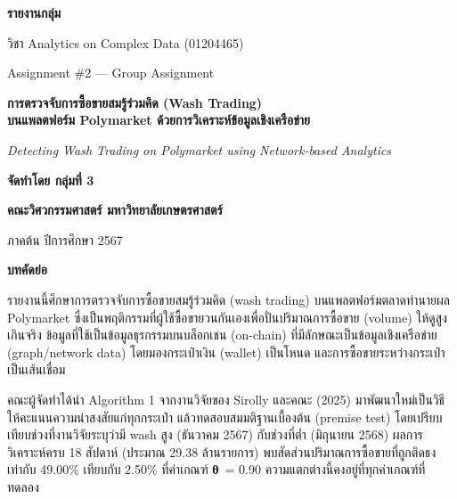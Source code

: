 \documentclass[12pt]{article}
\newcommand{\gtheta}{{\symfont\bfseries θ}}
\newcommand{\plainchap}[2]{%
  \clearpage\label{#2}%
  \begin{center}{\fontsize{20}{28}\selectfont\bfseries #1\par}\end{center}%
  \vspace{0.8em}\par}
\begin{document}
\thispagestyle{empty}
\begin{center}
  \vspace*{1.2cm}
  {\fontsize{26}{32}\selectfont\bfseries รายงานกลุ่ม}\par\vspace{0.6cm}
  {\fontsize{16}{22}\selectfont วิชา Analytics on Complex Data (01204465)}\par\vspace{0.2cm}
  {\fontsize{16}{22}\selectfont Assignment \#2 — Group Assignment}\par\vspace{1.4cm}

  {\fontsize{20}{28}\selectfont\bfseries การตรวจจับการซื้อขายสมรู้ร่วมคิด (Wash Trading)\\
   บนแพลตฟอร์ม Poly\-market ด้วยการวิเคราะห์ข้อมูลเชิงเครือข่าย}\par\vspace{0.5cm}
  {\fontsize{16}{22}\selectfont\textit{Detecting Wash Trading on Poly\-market using Network-based Analytics}}\par\vspace{1.6cm}

  {\fontsize{16}{22}\selectfont\bfseries จัดทำโดย กลุ่มที่ 3}\par\vspace{2.0cm}

  {\fontsize{16}{22}\selectfont\bfseries คณะวิศวกรรมศาสตร์ มหาวิทยาลัยเกษตรศาสตร์}\par\vspace{0.2cm}
  {\fontsize{16}{22}\selectfont ภาคต้น ปีการศึกษา 2567}\par
\end{center}

\plainchap{บทคัดย่อ}{abstract}
รายงานนี้ศึกษาการตรวจจับการซื้อขายสมรู้ร่วมคิด (wash trading) บนแพลตฟอร์มตลาดทำนายผล Poly\-market ซึ่งเป็นพฤติกรรมที่ผู้ใช้ซื้อขายวนกันเองเพื่อปั่นปริมาณการซื้อขาย (volume) ให้ดูสูงเกินจริง ข้อมูลที่ใช้เป็นข้อมูลธุรกรรมบนบล็อกเชน (on-chain) ที่มีลักษณะเป็นข้อมูลเชิงเครือข่าย (graph/network data) โดยมองกระเป๋าเงิน (wallet) เป็นโหนด และการซื้อขายระหว่างกระเป๋าเป็นเส้นเชื่อม

คณะผู้จัดทำได้นำ Algorithm 1 จากงานวิจัยของ Sirolly และคณะ (2025) มาพัฒนาใหม่เป็นวิธีให้คะแนนความน่าสงสัยแก่ทุกกระเป๋า แล้วทดสอบสมมติฐานเบื้องต้น (premise test) โดยเปรียบเทียบช่วงที่งานวิจัยระบุว่ามี wash สูง (ธันวาคม 2567) กับช่วงที่ต่ำ (มิถุนายน 2568) ผลการวิเคราะห์ครบ 18 สัปดาห์ (ประมาณ 29.38 ล้านรายการ) พบสัดส่วนปริมาณการซื้อขายที่ถูกติดธงเท่ากับ 49.00\% เทียบกับ 2.50\% ที่ค่าเกณฑ์ \gtheta\ = 0.90 ความแตกต่างนี้คงอยู่ที่ทุกค่าเกณฑ์ที่ทดลอง
\end{document}
